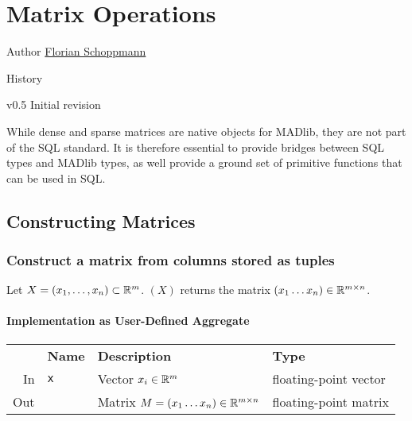 
\chapter{Matrix Operations}

\begin{moduleinfo}
\item[Author] \href{mailto:Florian.Schoppmann@emc.com}{Florian Schoppmann}
\item[History]
	\begin{modulehistory}
		\item[v0.5] Initial revision
	\end{modulehistory}
\end{moduleinfo}

While dense and sparse matrices are native objects for MADlib, they are not part of the SQL standard. It is therefore essential to provide bridges between SQL types and MADlib types, as well provide a ground set of primitive functions that can be used in SQL.

\section{Constructing Matrices}

\subsection{Construct a matrix from columns stored as tuples} \label{sec:matrix:matrixAgg}

Let $X = ( x_1, \dots, x_n ) \subset \mathbb{R}^m$. $(X)$ returns the matrix $(x_1 \dots x_n) \in \mathbb{R}^{m \times n}$.

\subsubsection{Implementation as User-Defined Aggregate}

\begin{center}
	\begin{tabular}{rlll}
		\toprule%
		& \textbf{Name} & \textbf{Description} & \textbf{Type}
		\\\otoprule
		In &
		\texttt{x} &
		Vector $x_i \in \mathbb{R}^m$ &
		floating-point vector
		\\\midrule
		Out & &
		Matrix $M = (x_1 \dots x_n) \in \mathbb{R}^{m \times n}$ &
		floating-point matrix
		\\\bottomrule
	\end{tabular}
\end{center}


